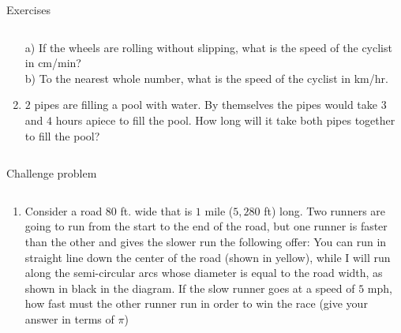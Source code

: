 \documentclass[9pt,aspectratio=169]{beamer}
\begin{document}
\begin{frame}{Exercises}
\begin{columns}[T]
\begin{column}{0.5\textwidth}
\begin{enumerate}
        a) If the wheels are rolling without slipping, what is the speed of the cyclist in cm/min?\\
        b) To the nearest whole number, what is the speed of the cyclist in km/hr.
        \item $2$ pipes are filling a pool with water.  By themselves the pipes would take $3$ and $4$ hours apiece to fill the pool.  How long will it take both pipes together to fill the pool?
      \end{enumerate}
    \end{column}
  \end{columns}
\end{frame}

\begin{frame}{Challenge problem}
  \begin{columns}[T]
    \begin{column}{0.5\textwidth}
      \begin{enumerate}
        \item Consider a road $80$ ft. wide that is $1$ mile ($5{,}280$ ft) long.  Two runners are going to run from the start to the end of the road, but one runner is faster than the other and gives the slower run the following offer:  You can run in straight line down the center of the road (shown in yellow), while I will run along the semi-circular arcs whose diameter is equal to the road width, as shown in black in the diagram.  If the slow runner goes at a speed of $5$ mph, how fast must the other runner run in order to win the race (give your answer in terms of $\pi$)\smallskip
        

\end{enumerate}
\end{column}
\end{columns}
\end{frame}
\end{document}
